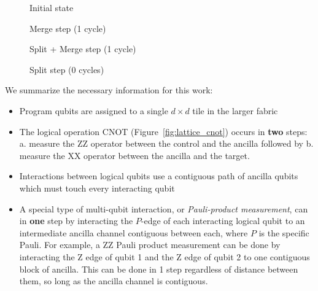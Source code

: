 \begin{figure*}
    \centering
    \begin{subfigure}{0.24\textwidth}
        
        \caption{Initial state}
    \end{subfigure}
    \begin{subfigure}{0.24\textwidth}
        
        \caption{Merge step (1 cycle)}
    \end{subfigure}
    \begin{subfigure}{0.24\textwidth}
        
        \caption{Split + Merge step (1 cycle)}
    \end{subfigure}
    \begin{subfigure}{0.24\textwidth}
        
        \caption{Split step (0 cycles)}
    \end{subfigure}
    \caption{Execution of a CNOT gate in lattice surgery using exactly 2 steps. Here the CNOT is performed with a single ancilla patch in between. In general, this patch can be arbitrarily long and shaped so long as the correct boundaries are adjacent. We assume ancilla prepartion is done ahead of time.}
    \label{fig:lattice_cnot}
\end{figure*}

We summarize the necessary information for this work:
\begin{itemize}
    \item Program qubits are assigned to a single $d \times d$ tile in the larger fabric
    \item The logical operation CNOT (Figure~\ref{fig:lattice_cnot}) occurs in \textbf{two} steps: a. measure the ZZ operator between the control and the ancilla followed by b. measure the XX operator between the ancilla and the target.
    \item Interactions between logical qubits use a contiguous path of ancilla qubits which must touch every interacting qubit
    \item A special type of multi-qubit interaction, or \textit{Pauli-product measurement}, can in \textbf{one} step by interacting the $P$-edge of each interacting logical qubit to an intermediate ancilla channel contiguous between each, where $P$ is the specific Pauli. For example, a ZZ Pauli product measurement can be done by interacting the Z edge of qubit 1 and the Z edge of qubit 2 to one contiguous block of ancilla. This can be done in 1 step regardless of distance between them, so long as the ancilla channel is contiguous.
\end{itemize}

